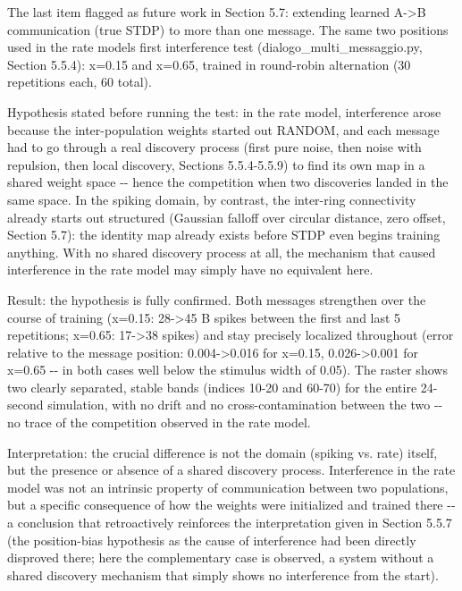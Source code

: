 \documentclass[
  english,
]{article}
\begin{document}
The last item flagged as future work in Section 5.7: extending learned A-\textgreater B communication (true STDP) to more than one message. The same two positions used in the rate model\textquotesingle s first interference test (dialogo\_\allowbreak{}multi\_\allowbreak{}messaggio.py, Section 5.5.4): x=0.15 and x=0.65, trained in round-robin alternation (30 repetitions each, 60 total).

Hypothesis stated before running the test: in the rate model, interference arose because the inter-population weights started out RANDOM, and each message had to go through a real discovery process (first pure noise, then noise with repulsion, then local discovery, Sections 5.5.4-5.5.9) to find its own map in a shared weight space -\/- hence the competition when two discoveries landed in the same space. In the spiking domain, by contrast, the inter-ring connectivity already starts out structured (Gaussian falloff over circular distance, zero offset, Section 5.7): the identity map already exists before STDP even begins training anything. With no shared discovery process at all, the mechanism that caused interference in the rate model may simply have no equivalent here.

Result: the hypothesis is fully confirmed. Both messages strengthen over the course of training (x=0.15: 28-\textgreater45 B spikes between the first and last 5 repetitions; x=0.65: 17-\textgreater38 spikes) and stay precisely localized throughout (error relative to the message position: 0.004-\textgreater0.016 for x=0.15, 0.026-\textgreater0.001 for x=0.65 -\/- in both cases well below the stimulus width of 0.05). The raster shows two clearly separated, stable bands (indices 10-20 and 60-70) for the entire 24-second simulation, with no drift and no cross-contamination between the two -\/- no trace of the competition observed in the rate model.

Interpretation: the crucial difference is not the domain (spiking vs. rate) itself, but the presence or absence of a shared discovery process. Interference in the rate model was not an intrinsic property of communication between two populations, but a specific consequence of how the weights were initialized and trained there -\/- a conclusion that retroactively reinforces the interpretation given in Section 5.5.7 (the position-bias hypothesis as the cause of interference had been directly disproved there; here the complementary case is observed, a system without a shared discovery mechanism that simply shows no interference from the start).
\end{document}
